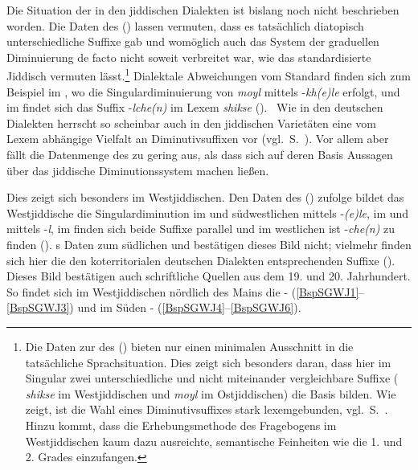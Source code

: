 Die Situation der  in den jiddischen Dialekten ist bislang noch nicht beschrieben worden. Die Daten des  (\citeyear[120]{Herzog2000}) lassen vermuten, dass es tatsächlich diatopisch unterschiedliche Suffixe gab und womöglich auch das System der graduellen Diminuierung de facto nicht soweit verbreitet war, wie das standardisierte Jiddisch vermuten lässt.\footnote{Die Daten zur  des  (\citeyear[120–125, insbes. Karte 36]{Herzog2000}) bieten nur einen minimalen Ausschnitt in die tatsächliche Sprachsituation. Dies zeigt sich besonders daran, dass hier im Singular zwei unterschiedliche und nicht miteinander vergleichbare Suffixe ( \textit{shikse}  im Westjiddischen und  \textit{moyl}  im Ostjiddischen) die Basis bilden. Wie \cite{Wrede1908} zeigt, ist die Wahl eines Diminutivsuffixes stark lexemgebunden, vgl.\, S.\, \pageref{wredeDIM}. Hinzu kommt, dass die Erhebungsmethode des Fragebogens im Westjiddischen kaum dazu ausreichte,  semantische Feinheiten wie die  1. und 2. Grades einzufangen.} Dialektale Abweichungen vom Standard finden sich zum Beispiel im \hai{{\NOJ}}, wo die Singulardiminuierung von   \textit{moyl}   mittels -\textit{kh(e)le} erfolgt, und im \hai{{\SOJ}} findet sich das Suffix -\textit{lche(n)} im Lexem  \textit{shikse}  (\citealt[122, Karten Nr. 36S1, 36S2]{Herzog2000}). \,%
Wie in den deutschen Dialekten herrscht so scheinbar auch in den jiddischen Varietäten eine vom Lexem abhängige Vielfalt an Diminutivsuffixen vor (vgl.\, S.\, \pageref{wredeDIM}). Vor allem aber fällt die Datenmenge des  zu gering aus, als dass sich auf deren Basis Aussagen über das jiddische Diminutionssystem machen ließen.\label{SOJDIM}

Dies zeigt sich besonders im Westjiddischen. Den Daten des  (\citeyear[120–125]{Herzog2000}) zufolge bildet das Westjiddische die Singulardiminution im \hai{{\SWJ}} und südwestlichen \hai{{\ZWJ}} mittels -\textit{(e)le}, im \hai{{\NWJ}} und  mittels -\textit{l}, im  finden sich beide Suffixe parallel und im westlichen \hai{{\ZWJ}} ist -\textit{che(n)} zu finden (\citealt[120–122, Karten Nr. 36, Nr. 36S1]{Herzog2000}). \citeauthor{GuggenheimGruenberg1973}s Daten zum südlichen \hai{{\SWJ}} und \hai{{\ZWJ}} bestätigen dieses Bild nicht; vielmehr finden sich hier die den koterritorialen deutschen Dialekten entsprechenden Suffixe (\citealt[92, Karte Nr. 33]{GuggenheimGruenberg1973}). Dieses Bild bestätigen auch schriftliche Quellen aus dem 19. und 20. Jahrhundert. So findet sich im Westjiddischen nördlich des Mains die - (\ref{BspSGWJ1}–\ref{BspSGWJ3}) und im Süden - (\ref{BspSGWJ4}–\ref{BspSGWJ6}). \label{DIMSGWJ}

